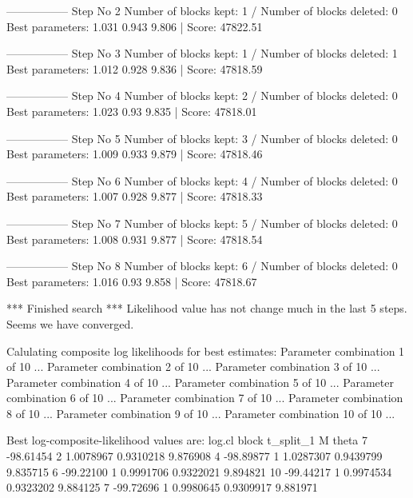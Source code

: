 \begin{Schunk}
\begin{Soutput}
----------------- 
Step No 2 
Number of blocks kept: 1  / Number of blocks deleted: 0 
Best parameters:  1.031 0.943 9.806 | Score: 47822.51 

----------------- 
Step No 3 
Number of blocks kept: 1  / Number of blocks deleted: 1 
Best parameters:  1.012 0.928 9.836 | Score: 47818.59 

----------------- 
Step No 4 
Number of blocks kept: 2  / Number of blocks deleted: 0 
Best parameters:  1.023 0.93 9.835 | Score: 47818.01 

----------------- 
Step No 5 
Number of blocks kept: 3  / Number of blocks deleted: 0 
Best parameters:  1.009 0.933 9.879 | Score: 47818.46 

----------------- 
Step No 6 
Number of blocks kept: 4  / Number of blocks deleted: 0 
Best parameters:  1.007 0.928 9.877 | Score: 47818.33 

----------------- 
Step No 7 
Number of blocks kept: 5  / Number of blocks deleted: 0 
Best parameters:  1.008 0.931 9.877 | Score: 47818.54 

----------------- 
Step No 8 
Number of blocks kept: 6  / Number of blocks deleted: 0 
Best parameters:  1.016 0.93 9.858 | Score: 47818.67 

*** Finished search *** 
Likelihood value has not change much in the last 5 steps. 
Seems we have converged. 

Calulating composite log likelihoods for best estimates: 
Parameter combination 1 of 10 ... 
Parameter combination 2 of 10 ... 
Parameter combination 3 of 10 ... 
Parameter combination 4 of 10 ... 
Parameter combination 5 of 10 ... 
Parameter combination 6 of 10 ... 
Parameter combination 7 of 10 ... 
Parameter combination 8 of 10 ... 
Parameter combination 9 of 10 ... 
Parameter combination 10 of 10 ... 


Best log-composite-likelihood values are: 
      log.cl block t_split_1         M    theta
7  -98.61454     2 1.0078967 0.9310218 9.876908
4  -98.89877     1 1.0287307 0.9439799 9.835715
6  -99.22100     1 0.9991706 0.9322021 9.894821
10 -99.44217     1 0.9974534 0.9323202 9.884125
7  -99.72696     1 0.9980645 0.9309917 9.881971
\end{Soutput}
\end{Schunk}

